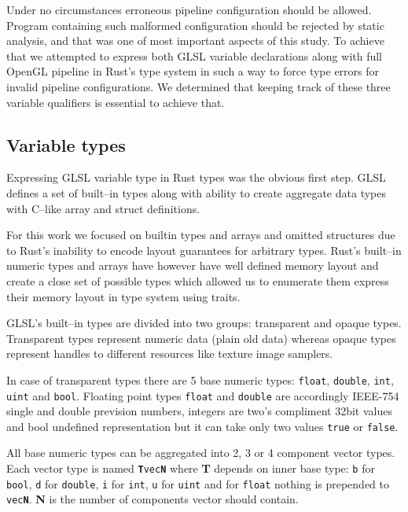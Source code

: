 Under no circumstances erroneous pipeline configuration should be allowed. Program containing such malformed configuration should be rejected by static analysis, and that was one of most important aspects of this study.
To achieve that we attempted to express both GLSL variable declarations along with full OpenGL pipeline in Rust's type system in such a way to force type errors for invalid pipeline configurations.
We determined that keeping track of these three variable qualifiers is essential to achieve that.

\subsection{Variable types}

Expressing GLSL variable type in Rust types was the obvious first step. GLSL defines a set of built--in types along with ability to create aggregate data types with C--like array and struct definitions.

For this work we focused on builtin types and arrays and omitted structures due to Rust's inability to encode layout guarantees for arbitrary types.
Rust's built--in numeric types and arrays have however have well defined memory layout and create a close set of possible types which allowed us to enumerate them express their memory layout in type system using traits.

GLSL's built--in types are divided into two groups: transparent and opaque types.
Transparent types represent numeric data (plain old data) whereas opaque types represent handles to different resources like texture image samplers.

In case of transparent types there are 5 base numeric types: \texttt{float}, \texttt{double}, \texttt{int}, \texttt{uint} and \texttt{bool}.
Floating point types \texttt{float} and \texttt{double} are accordingly IEEE-754 single and double prevision numbers, integers are two's compliment 32bit values and bool undefined representation but it can take only two values \texttt{true} or \texttt{false}.

All base numeric types can be aggregated into 2, 3 or 4 component vector types. Each vector type is named \texttt{\textbf{T}vec\textbf{N}}
where \textbf{T} depends on inner base type: \texttt{b} for \texttt{bool}, \texttt{d} for \texttt{double}, \texttt{i} for \texttt{int}, \texttt{u} for \texttt{uint} and for \texttt{float} nothing is prepended to \texttt{vec\textbf{N}}.
\textbf{N} is the number of components vector should contain.

